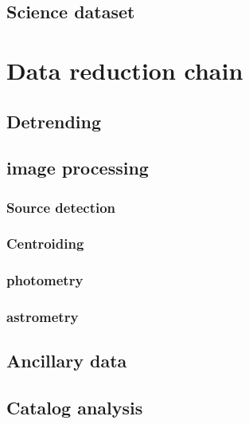 \documentclass[\docopts]{\docclass}
\begin{document}
\subsection{Science dataset}
\label{sec:data}

\section{Data reduction chain}
\label{sec:dataanalysis}

\subsection{Detrending}
\label{sec:detrending}

\subsection{image processing}
\label{sec:processing}

\subsubsection{Source detection}
\label{sec:detection}

\subsubsection{Centroiding}
\label{sec:centroiding}

\subsubsection{photometry}
\label{sec:photometry}

\subsubsection{astrometry}
\label{sec:astrometry}

\subsection{Ancillary data}
\label{sec:ancillary}


\subsection{Catalog analysis}
\label{sec:analysis}
\end{document}

